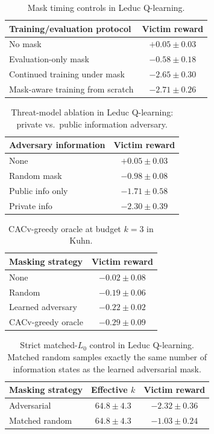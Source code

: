 \documentclass{article}
\begin{document}
\begin{table}[ht]
\centering
\caption{Mask timing controls in Leduc Q-learning.}
\begin{tabular}{lc}
\toprule
Training/evaluation protocol & Victim reward \\
\midrule
No mask & $+0.05 \pm 0.03$ \\
Evaluation-only mask & $-0.58 \pm 0.18$ \\
Continued training under mask & $-2.65 \pm 0.30$ \\
Mask-aware training from scratch & $-2.71 \pm 0.26$ \\
\bottomrule
\end{tabular}
\end{table}

\begin{table}[ht]
\centering
\caption{Threat-model ablation in Leduc Q-learning: private vs.\ public information adversary.}
\begin{tabular}{lc}
\toprule
Adversary information & Victim reward \\
\midrule
None & $+0.05 \pm 0.03$ \\
Random mask & $-0.98 \pm 0.08$ \\
Public info only & $-1.71 \pm 0.58$ \\
Private info & $-2.30 \pm 0.39$ \\
\bottomrule
\end{tabular}
\end{table}

\begin{table}[ht]
\centering
\caption{CACv-greedy oracle at budget $k=3$ in Kuhn.}
\begin{tabular}{lc}
\toprule
Masking strategy & Victim reward \\
\midrule
None & $-0.02 \pm 0.08$ \\
Random & $-0.19 \pm 0.06$ \\
Learned adversary & $-0.22 \pm 0.02$ \\
CACv-greedy oracle & $\mathbf{-0.29 \pm 0.09}$ \\
\bottomrule
\end{tabular}
\end{table}

\begin{table}[ht]
\centering
\caption{Strict matched-$L_0$ control in Leduc Q-learning. Matched random samples exactly the same number of information states as the learned adversarial mask.}
\begin{tabular}{lcc}
\toprule
Masking strategy & Effective $k$ & Victim reward \\
\midrule
Adversarial & $64.8 \pm 4.3$ & $-2.32 \pm 0.36$ \\
Matched random & $64.8 \pm 4.3$ & $-1.03 \pm 0.24$ \\
\bottomrule
\end{tabular}
\end{table}
\end{document}
